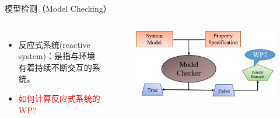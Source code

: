 \documentclass[9pt, CJK]{beamer}
\begin{document}
\begin{frame}
\begin{block}{模型检测（Model Checking）}
\begin{columns}
\begin{itemize}
					\item {\small 反应式系统(reactive system)：是指与环境有着持续不断交互的系统。}
					\item \textcolor{red}{如何计算反应式系统的WP?}
				\end{itemize}
				\begin{figure}
					\includegraphics[scale=0.35]{figures/MC}
				\end{figure}
			\end{columns}
		\end{block}
	\end{frame}
	
\end{document}
